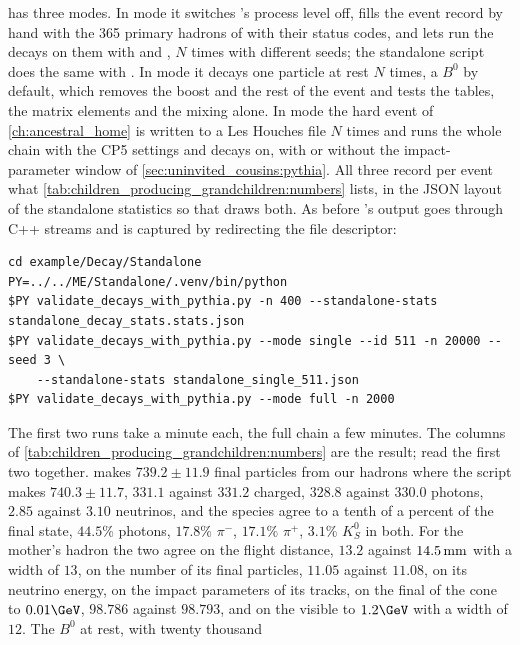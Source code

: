  has three modes. In mode
 it switches \PYTHIA's process level off, fills the event
record by hand with the 365 primary hadrons of  with
their status codes, and lets  run the decays on them with
 and , $N$ times
with different seeds; the standalone script does the same with
. In mode  it decays one particle at rest
$N$ times, a $B^0$ by default, which removes the boost and the rest of
the event and tests the tables, the matrix elements and the mixing alone.
In mode  the hard event of \cref{ch:ancestral_home} is written
to a Les Houches file $N$ times and \PYTHIA runs the whole chain with the
CP5 settings and decays on, with or without the impact-parameter window
of \cref{sec:uninvited_cousins:pythia}. All three record per event what
\cref{tab:children_producing_grandchildren:numbers} lists, in the JSON
layout of the standalone statistics so that 
draws both. As before \PYTHIA's output goes through C++ streams and is
captured by redirecting the file descriptor:
\begin{verbatim}
cd example/Decay/Standalone
PY=../../ME/Standalone/.venv/bin/python
$PY validate_decays_with_pythia.py -n 400 --standalone-stats standalone_decay_stats.stats.json
$PY validate_decays_with_pythia.py --mode single --id 511 -n 20000 --seed 3 \
    --standalone-stats standalone_single_511.json
$PY validate_decays_with_pythia.py --mode full -n 2000
\end{verbatim}
The first two runs take a minute each, the full chain a few minutes. The
columns of \cref{tab:children_producing_grandchildren:numbers} are the
result; read the first two together. \PYTHIA makes $739.2\pm11.9$ final
particles from our hadrons where the script makes $740.3\pm11.7$,
$331.1$ against $331.2$ charged, $328.8$ against $330.0$ photons, $2.85$
against $3.10$ neutrinos, and the species agree to a tenth of a percent
of the final state, $44.5\%$ photons, $17.8\%$ $\pi^-$, $17.1\%$ $\pi^+$,
$3.1\%$ $K_S^0$ in both. For the mother's hadron the two agree on the
flight distance, $13.2$ against $14.5\,\mathrm{mm}$ with a width of $13$, on the
number of its final particles, $11.05$ against $11.08$, on its neutrino
energy, on the impact parameters of its tracks, on the final \pt of the
cone to $0.01\GeV$, $98.786$ against $98.793$, and on the visible \pt to
$1.2\GeV$ with a width of $12$. The $B^0$ at rest, with twenty thousand
